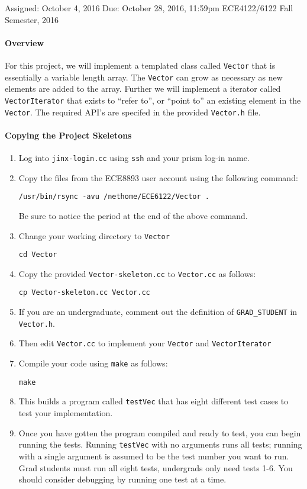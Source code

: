 \documentclass[10pt]{article}
\begin{document}
{Assigned: October 4, 2016}
{Due: October 28, 2016, 11:59pm}
{ECE4122/6122}
{Fall Semester, 2016}

\paragraph{Overview}
For this project, we will implement a templated class called {\tt Vector}
that is essentially a variable length array.  The {\tt Vector}
can grow as necessary as new elements are added to the array.  Further
we will implement a iterator called {\tt VectorIterator} that exists to
``refer to'', or ``point to'' an existing element in the {\tt Vector}.
The required API's are specifed in the provided {\tt Vector.h} file.

\paragraph{Copying the Project Skeletons}
\begin{enumerate}
\item Log into {\tt jinx-login.cc} using {\tt ssh} and your prism log-in name.
\item Copy the files from the ECE8893 user account using the following
command:
\begin{verbatim}
/usr/bin/rsync -avu /nethome/ECE6122/Vector .
\end{verbatim}
Be sure to notice the period at the end of the above command.
\item Change your working directory to {\tt Vector}
\begin{verbatim}
cd Vector
\end{verbatim}
\item Copy the provided {\tt Vector-skeleton.cc} to {\tt Vector.cc} as follows:
\begin{verbatim}
cp Vector-skeleton.cc Vector.cc
\end{verbatim}
\item If you are an undergraduate, comment out the definition of
{\tt GRAD\_STUDENT} in {\tt Vector.h}.
\item Then edit {\tt Vector.cc} to implement your {\tt Vector} and
{\tt VectorIterator}
\item Compile your code using {\tt make} as follows:
\begin{verbatim}
make
\end{verbatim}
\item This builds a program called {\tt testVec} that has eight
different test cases to test your implementation.
\item Once you have gotten the program compiled and ready to test,
you can begin running the tests.  Running {\tt testVec} with no arguments
runs all tests; running with a single argument is assumed to be the
test number you want to run.  Grad students must run all eight tests,
undergrads only need tests 1-6.  You should consider debugging by running
one test at a time.
\end{enumerate}
\end{document}

